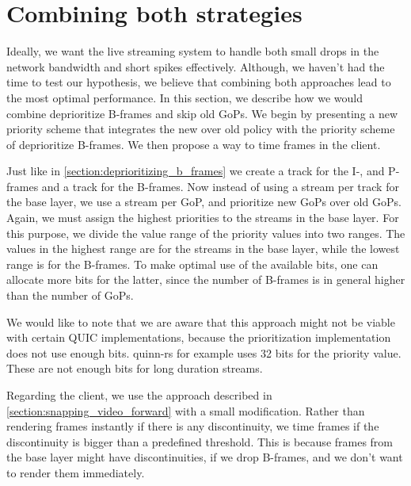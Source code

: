 \section{Combining both strategies}
Ideally, we want the live streaming system to handle both small drops in the network bandwidth and short spikes effectively. Although, we haven't had the time to test our hypothesis, we believe that combining both approaches lead to the most optimal performance. In this section, we describe how we would combine deprioritize B-frames and skip old GoPs. We begin by presenting a new priority scheme that integrates the new over old policy with the priority scheme of deprioritize B-frames. We then propose a way to time frames in the client.

Just like in \autoref{section:deprioritizing_b_frames} we create a track for the I-, and P-frames and a track for the B-frames. Now instead of using a stream per track for the base layer, we use a stream per GoP, and prioritize new GoPs over old GoPs. Again, we must assign the highest priorities to the streams in the base layer. For this purpose, we divide the value range of the priority values into two ranges. The values in the highest range are for the streams in the base layer, while the lowest range is for the B-frames. To make optimal use of the available bits, one can allocate more bits for the latter, since the number of B-frames is in general higher than the number of GoPs.

We would like to note that we are aware that this approach might not be viable with certain QUIC implementations, because the prioritization implementation does not use enough bits. quinn-rs for example uses 32 bits for the priority value. These are not enough bits for long duration streams. %

Regarding the client, we use the approach described in \ref{section:snapping_video_forward} with a small modification. Rather than rendering frames instantly if there is any discontinuity, we time frames if the discontinuity is bigger than a predefined threshold. This is because frames from the base layer might have discontinuities, if we drop B-frames, and we don't want to render them immediately. %
